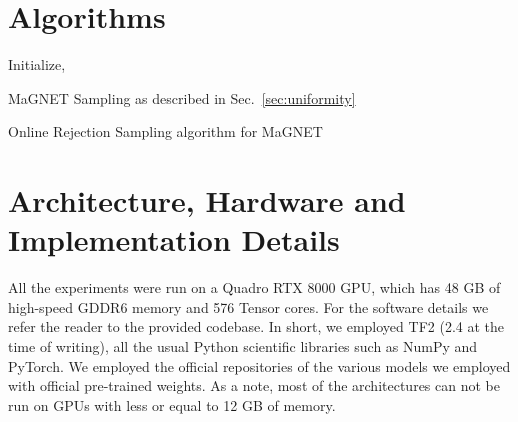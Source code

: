 \section{Algorithms}
\label{appendix:online_alg}

\begin{algorithm}[]
	\SetAlgoLined
	 Initialize,  \;
\For{}{
	
	\;
	
	}
    
  
	
	\caption{MaGNET Sampling as described in Sec.~\ref{sec:uniformity}}
	\label{alg:magnet}
	
\end{algorithm}



\begin{algorithm}[]
	\SetAlgoLined
	
	\caption{Online Rejection Sampling algorithm for MaGNET}
	\label{alg:RS_magnet}
	
\end{algorithm}


\section{Architecture, Hardware and Implementation Details}
\label{appendix:architecture}


All the experiments were run on a Quadro RTX 8000 GPU, which has 48 GB of high-speed GDDR6 memory and 576 Tensor cores. For the software details we refer the reader to the provided codebase. In short, we employed TF2 (2.4 at the time of writing), all the usual Python scientific libraries such as NumPy and PyTorch. We employed the official repositories of the various models we employed with official pre-trained weights.
As a note, most of the architectures can not be run on GPUs with less or equal to 12 GB of memory.


